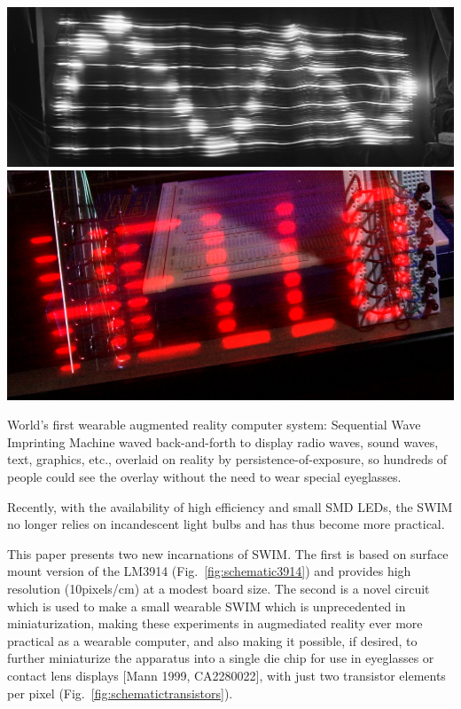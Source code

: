 \documentclass{sigchi-ext}
\begin{document}
\begin{marginfigure}[-39pc]
\begin{minipage}{\marginparwidth}
 \includegraphics[width=.8\textwidth]{SittingWaveTwoCycles4crop.jpg}
 \includegraphics[width=.8\textwidth]{hello2cropcrop.jpg}
    \centering
    \caption{
             World's first wearable augmented reality computer system:
             Sequential Wave Imprinting Machine waved back-and-forth
             to display
             radio waves, sound waves, text, graphics, etc.,
             overlaid on reality by persistence-of-exposure,
             so hundreds of people could see the
             overlay without the need to wear special eyeglasses.
            }
    \label{fig:swim74}
  \end{minipage}
\end{marginfigure}
Recently, with the availability of high efficiency and small SMD LEDs, the SWIM
no longer relies on incandescent light bulbs and has thus become more
practical.

This paper presents two new incarnations of SWIM. The first is based on
surface mount version of the
LM3914 (Fig.~\ref{fig:schematic3914})
and provides high resolution (10pixels/cm) at a modest
board size. The second is a novel circuit which is used to make a small
wearable SWIM which is unprecedented in miniaturization,
making these experiments in augmediated reality ever more practical
as a wearable computer, and also making it possible, if desired, to
further miniaturize the apparatus into a single die chip for use in eyeglasses
or contact lens displays [Mann 1999, CA2280022],
with just two transistor elements per pixel
(Fig.~\ref{fig:schematictransistors}).

\end{document}
